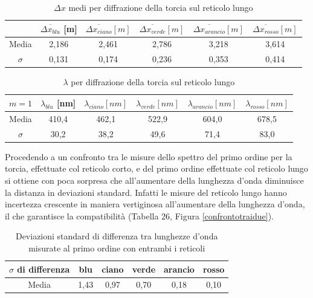 \documentclass{article}
\begin{document}
\begin{table}[h]
    \centering
\begin{tabular}{||c|c|c|c|c|c||}
    \hline
     & \cellcolor{blue}$\overline{\Delta x_{blu}}$ [m] & \cellcolor{cyan}$\overline{\Delta x_{ciano}} [m]$ & \cellcolor{green}$\overline{\Delta x_{verde}}[m]$ & \cellcolor{orange}$\overline{\Delta x_{arancio}}[m]$ & \cellcolor{red}$\overline{\Delta x_{rosso}}[m]$ \\
    \hline
    Media & 2,186 & 2,461 & 2,786 & 3,218 & 3,614 \\
    $\sigma$ & 0,131 & 0,174 & 0,236 & 0,353 & 0,414 \\
    \hline
\end{tabular}
\caption{$\Delta x$ medi per diffrazione della torcia sul reticolo lungo}
\end{table}

\begin{table}[h]
    \centering
\begin{tabular}{||c|c|c|c|c|c||}
    \hline
     $m = 1$ & \cellcolor{blue}$\lambda_{blu}$ [nm] & \cellcolor{cyan}$\lambda_{ciano} [nm]$ & \cellcolor{green}$\lambda_{verde}[nm]$ & \cellcolor{orange}$\lambda_{arancio}[nm]$ & \cellcolor{red}$\lambda_{rosso}[nm]$ \\
    \hline
    Media & 410,4 & 462,1 & 522,9 & 604,0 & 678,5 \\
    $\sigma$ & 30,2 & 38,2 & 49,6 & 71,4 & 83,0\\
    \hline
\end{tabular}
\caption{$\lambda$ per diffrazione della torcia sul reticolo lungo}
\end{table}

Procedendo a un confronto tra le misure dello spettro del primo ordine per la torcia, effettuate col reticolo corto, e del primo ordine effettuate col reticolo lungo si ottiene con poca sorpresa che all'aumentare della lunghezza d'onda diminuisce la distanza in deviazioni standard. Infatti le misure del reticolo lungo hanno incertezza crescente in maniera vertiginosa all'aumentare della lunghezza d'onda, il che garantisce la compatibilità (Tabella 26, Figura \ref{confrontotraidue}).

\begin{table}[h]
    \centering
\begin{tabular}{||c|c|c|c|c|c||}
    \hline
     $\sigma$ di differenza & \cellcolor{blue}blu& \cellcolor{cyan}ciano  & \cellcolor{green}verde & \cellcolor{orange}arancio & \cellcolor{red}rosso \\
    \hline
    Media & 1,43 & 0,97 & 0,70 & 0,18 & 0,10 \\
    \hline
\end{tabular}
\caption{Deviazioni standard di differenza tra lunghezze d'onda misurate al primo ordine con entrambi i reticoli}
\end{table}
\end{document}
